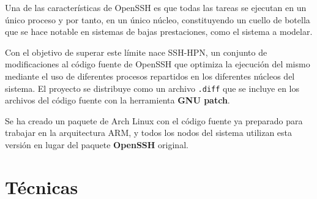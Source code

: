 Una de las características de OpenSSH es que todas las tareas se ejecutan en un único proceso y por tanto, en un único núcleo, constituyendo un cuello de botella que se hace notable en sistemas de bajas prestaciones, como el sistema a modelar.

Con el objetivo de superar este límite nace SSH-HPN\citationneeded, un conjunto de modificaciones al código fuente de OpenSSH que optimiza la ejecución del mismo mediante el uso de diferentes procesos repartidos en los diferentes núcleos del sistema. El proyecto se distribuye como un archivo \texttt{.diff} que se incluye en los archivos del código fuente con la herramienta \textbf{GNU patch}.

Se ha creado un paquete de Arch Linux con el código fuente ya preparado para trabajar en la arquitectura ARM, y todos los nodos del sistema utilizan esta versión en lugar del paquete \textbf{OpenSSH} original.

\chapter{Técnicas}
